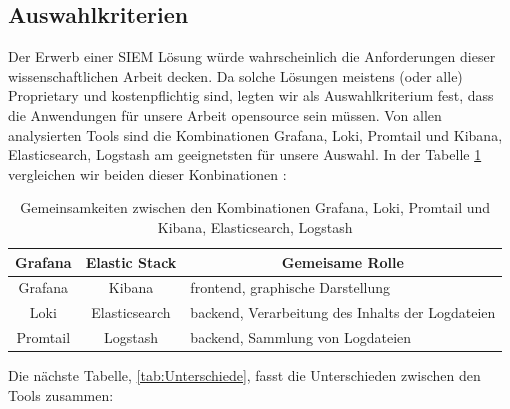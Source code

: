 \subsection{Auswahlkriterien}
Der Erwerb einer \gls{SIEM} Lösung würde wahrscheinlich die Anforderungen dieser wissenschaftlichen Arbeit decken. Da solche Lösungen meistens (oder alle) \gls{Proprietary} und kostenpflichtig sind, legten wir als Auswahlkriterium fest, dass die Anwendungen für unsere Arbeit \gls{opensource} sein müssen. Von allen analysierten Tools sind die Kombinationen Grafana, Loki, Promtail und Kibana, Elasticsearch, Logstash  am geeignetsten für unsere Auswahl. In der Tabelle \ref{tab:Vergleich_GrafanaELK} vergleichen wir beiden dieser Konbinationen \citep{Anand_LokixELK}:

\begin{table}[H]
   \begin{tabularx}{\textwidth}{|c|c|X|}
   \hline
   \multicolumn{1}{|c|}{\textbf{Grafana}} & \multicolumn{1}{|c|}{\textbf{Elastic Stack}} & \multicolumn{1}{|c|}{\textbf{Gemeisame Rolle}} \\
   \hline
      Grafana & Kibana & \gls{frontend}, graphische Darstellung\\
   \hline
      Loki & Elasticsearch & \gls{backend}, Verarbeitung des Inhalts der Logdateien \\
   \hline
      Promtail & Logstash & \gls{backend}, Sammlung von Logdateien \\
      \hline
   \end{tabularx}
   \caption[Gemeinsamkeiten zwischen den Kombinationen Grafana, Loki, Promtail und Kibana, Elasticsearch, Logstash]
   {Gemeinsamkeiten zwischen den Kombinationen Grafana, Loki, Promtail und Kibana, Elasticsearch, Logstash}
   \label{tab:Vergleich_GrafanaELK}
\end{table}

Die nächste Tabelle, \ref{tab:Unterschiede}, fasst die Unterschieden zwischen den Tools zusammen:

